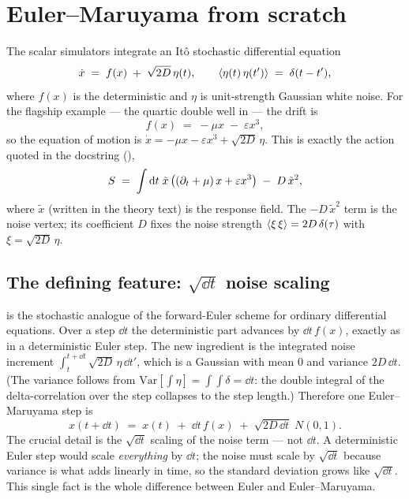 \section{Euler--Maruyama from scratch}

The scalar simulators integrate an It\^o stochastic differential equation
\begin{equation}
  \dot x \;=\; f(x) \;+\; \sqrt{2D}\,\eta(t),
  \qquad
  \left\langle \eta(t)\,\eta(t') \right\rangle \;=\; \delta(t-t'),
  \label{eq:sde}
\end{equation}
where $f(x)$ is the deterministic  and $\eta$ is unit-strength
Gaussian white noise. For the flagship example --- the quartic double well in
 --- the drift is
\[
  f(x) \;=\; -\mu x \;-\; \varepsilon x^{3},
\]
so the equation of motion is $\dot x = -\mu x - \varepsilon x^{3} + \sqrt{2D}\,
\eta$. This is exactly the \msrjd{} action quoted in the docstring
(),
\[
  S \;=\; \int \mathrm{d} t\; \tilde x\,\bigl((\partial_t + \mu)\,x + \varepsilon x^{3}\bigr)
        \;-\; D\,\tilde x^{2},
\]
where $\tilde x$ (written  in the theory text) is the \msrjd{} response
field. The $-D\,\tilde x^{2}$ term is the noise vertex; its coefficient $D$ fixes
the noise strength $\left\langle \xi\,\xi \right\rangle = 2D\,\delta(\tau)$ with $\xi = \sqrt{2D}\,\eta$.

\subsection{The defining feature: $\sqrt{\dd t}$ noise scaling}

 is the stochastic analogue of the forward-Euler scheme for
ordinary differential equations. Over a step $\dd t$ the deterministic part
advances by $\dd t\,f(x)$, exactly as in a deterministic Euler step. The new
ingredient is the integrated noise increment $\int_t^{t+\dd t}\sqrt{2D}\,\eta\,
\dd t'$, which is a Gaussian with mean $0$ and variance $2D\,\dd t$. (The variance
follows from $\mathrm{Var}\!\left[\int \eta\right] = \int\!\!\int \delta = \dd t$:
the double integral of the delta-correlation over the step collapses to the step
length.) Therefore one Euler--Maruyama step is
\begin{equation}
  x(t+\dd t) \;=\; x(t) \;+\; \dd t\, f(x) \;+\; \sqrt{2D\,\dd t}\;N(0,1).
  \label{eq:em}
\end{equation}
The crucial detail is the $\sqrt{\dd t}$ scaling of the noise term --- not $\dd t$.
A deterministic Euler step would scale \emph{everything} by $\dd t$; the noise
must scale by $\sqrt{\dd t}$ because variance is what adds linearly in time, so
the standard deviation grows like $\sqrt{\dd t}$. This single fact is the whole
difference between Euler and Euler--Maruyama.


